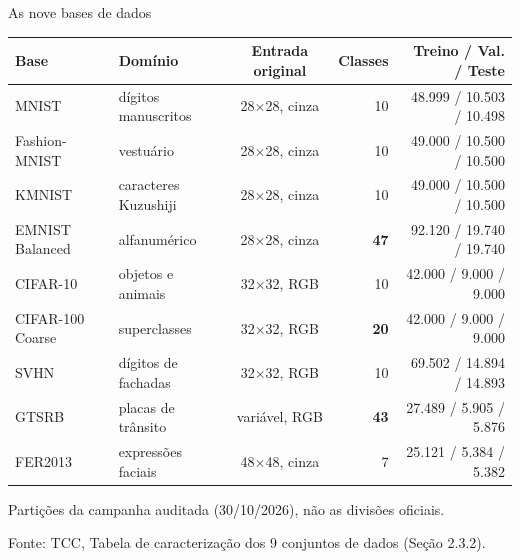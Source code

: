 \documentclass[aspectratio=169,11pt,brazil]{beamer}
\newcommand{\fonte}[1]{\par\vfill{\tiny\color{gray}Fonte: #1\par}}
\begin{document}
\begin{frame}{As nove bases de dados}
  \centering
  \scriptsize
  \begin{tabular}{@{}llcrr@{}}
    \toprule
    \textbf{Base} & \textbf{Domínio} & \textbf{Entrada original} & \textbf{Classes} & \textbf{Treino / Val. / Teste} \\
    \midrule
    MNIST & dígitos manuscritos & 28$\times$28, cinza & 10 & 48.999 / 10.503 / 10.498 \\
    Fashion-MNIST & vestuário & 28$\times$28, cinza & 10 & 49.000 / 10.500 / 10.500 \\
    KMNIST & caracteres Kuzushiji & 28$\times$28, cinza & 10 & 49.000 / 10.500 / 10.500 \\
    EMNIST Balanced & alfanumérico & 28$\times$28, cinza & \textbf{47} & 92.120 / 19.740 / 19.740 \\
    CIFAR-10 & objetos e animais & 32$\times$32, RGB & 10 & 42.000 / 9.000 / 9.000 \\
    CIFAR-100 Coarse & superclasses & 32$\times$32, RGB & \textbf{20} & 42.000 / 9.000 / 9.000 \\
    SVHN & dígitos de fachadas & 32$\times$32, RGB & 10 & 69.502 / 14.894 / 14.893 \\
    GTSRB & placas de trânsito & variável, RGB & \textbf{43} & 27.489 / 5.905 / 5.876 \\
    FER2013 & expressões faciais & 48$\times$48, cinza & 7 & 25.121 / 5.384 / 5.382 \\
    \bottomrule
  \end{tabular}

  \vspace{0.2cm}
  \footnotesize Partições da campanha auditada (30/10/2026), não as divisões oficiais.
  \fonte{TCC, Tabela de caracterização dos 9 conjuntos de dados (Seção 2.3.2).}
\end{frame}
\end{document}
